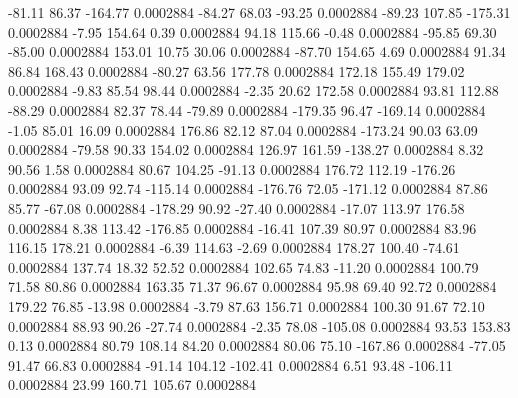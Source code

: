       -81.11       86.37     -164.77     0.0002884
      -84.27       68.03      -93.25     0.0002884
      -89.23      107.85     -175.31     0.0002884
       -7.95      154.64        0.39     0.0002884
       94.18      115.66       -0.48     0.0002884
      -95.85       69.30      -85.00     0.0002884
      153.01       10.75       30.06     0.0002884
      -87.70      154.65        4.69     0.0002884
       91.34       86.84      168.43     0.0002884
      -80.27       63.56      177.78     0.0002884
      172.18      155.49      179.02     0.0002884
       -9.83       85.54       98.44     0.0002884
       -2.35       20.62      172.58     0.0002884
       93.81      112.88      -88.29     0.0002884
       82.37       78.44      -79.89     0.0002884
     -179.35       96.47     -169.14     0.0002884
       -1.05       85.01       16.09     0.0002884
      176.86       82.12       87.04     0.0002884
     -173.24       90.03       63.09     0.0002884
      -79.58       90.33      154.02     0.0002884
      126.97      161.59     -138.27     0.0002884
        8.32       90.56        1.58     0.0002884
       80.67      104.25      -91.13     0.0002884
      176.72      112.19     -176.26     0.0002884
       93.09       92.74     -115.14     0.0002884
     -176.76       72.05     -171.12     0.0002884
       87.86       85.77      -67.08     0.0002884
     -178.29       90.92      -27.40     0.0002884
      -17.07      113.97      176.58     0.0002884
        8.38      113.42     -176.85     0.0002884
      -16.41      107.39       80.97     0.0002884
       83.96      116.15      178.21     0.0002884
       -6.39      114.63       -2.69     0.0002884
      178.27      100.40      -74.61     0.0002884
      137.74       18.32       52.52     0.0002884
      102.65       74.83      -11.20     0.0002884
      100.79       71.58       80.86     0.0002884
      163.35       71.37       96.67     0.0002884
       95.98       69.40       92.72     0.0002884
      179.22       76.85      -13.98     0.0002884
       -3.79       87.63      156.71     0.0002884
      100.30       91.67       72.10     0.0002884
       88.93       90.26      -27.74     0.0002884
       -2.35       78.08     -105.08     0.0002884
       93.53      153.83        0.13     0.0002884
       80.79      108.14       84.20     0.0002884
       80.06       75.10     -167.86     0.0002884
      -77.05       91.47       66.83     0.0002884
      -91.14      104.12     -102.41     0.0002884
        6.51       93.48     -106.11     0.0002884
       23.99      160.71      105.67     0.0002884
